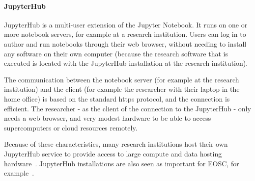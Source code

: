\paragraph{JupyterHub}\label{sec:jupyterhub} JupyterHub is a multi-user extension of the Jupyter Notebook.
It runs on one or more notebook servers, for example at a research institution.
Users can log in to author and run notebooks through their web browser, without
needing to install any software on their own computer (because the research
software that is executed is located with the JupyterHub installation at the
research institution).

The communication between the notebook server (for example at the research
institution) and the client (for example the researcher with their laptop in the
home office) is based on the standard https protocol, and the connection is
efficient. The researcher - as the client of the connection to the JupyterHub -
only needs a web browser, and very modest hardware to be able to access
supercomputers or cloud resources remotely.


Because of these characteristics, many research institutions host their own
JupyterHub service to provide access to large compute and data hosting
hardware~\cite{Fangohr2020}. JupyterHub installations are also seen as important
for EOSC, for example~\cite{panosc-jupyter-binder}. 


% 
% 

